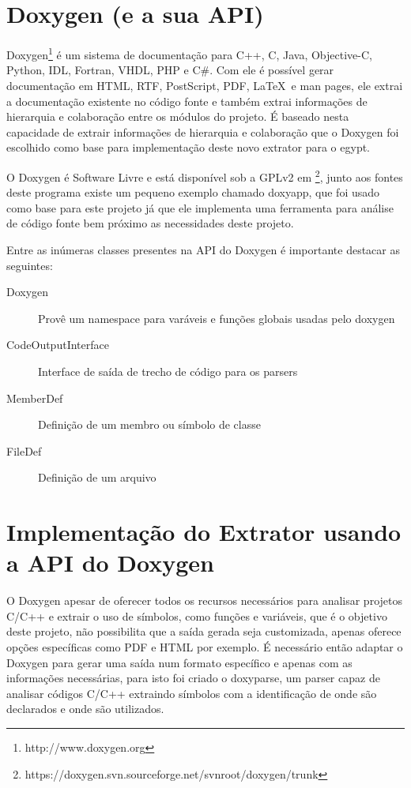 \section{Doxygen (e a sua API)}

Doxygen\footnote{http://www.doxygen.org} é um sistema de documentação para C++,
C, Java, Objective-C, Python, IDL, Fortran, VHDL, PHP e C\#. Com ele é possível
gerar documentação em HTML, RTF, PostScript, PDF, \LaTeX\ e man pages, ele
extrai a documentação existente no código fonte e também extrai informações de
hierarquia e colaboração entre os módulos do projeto. É baseado nesta
capacidade de extrair informações de hierarquia e colaboração que o Doxygen foi
escolhido como base para implementação deste novo extrator para o egypt.

O Doxygen é Software Livre e está disponível sob a GPLv2 em
\footnote{https://doxygen.svn.sourceforge.net/svnroot/doxygen/trunk}, junto aos
fontes deste programa existe um pequeno exemplo chamado doxyapp, que foi usado
como base para este projeto já que ele implementa uma ferramenta para análise
de código fonte bem próximo as necessidades deste projeto.

Entre as inúmeras classes presentes na API do Doxygen é importante
destacar as seguintes:

\begin{description}
\item[Doxygen] Provê um namespace para varáveis e funções globais usadas pelo doxygen
\item[CodeOutputInterface] Interface de saída de trecho de código para os parsers
\item[MemberDef] Definição de um membro ou símbolo de classe
\item[FileDef] Definição de um arquivo
\end{description}

\section{Implementação do Extrator usando a API do Doxygen}

O Doxygen apesar de oferecer todos os recursos necessários para
analisar projetos C/C++ e extrair o uso de símbolos, como funções e variáveis,
que é o objetivo deste projeto, não possibilita que a saída gerada seja
customizada, apenas oferece opções específicas como PDF e HTML por exemplo. É
necessário então adaptar o Doxygen para gerar uma saída num formato
específico e apenas com as informações necessárias, para isto foi criado o
doxyparse, um parser capaz de analisar códigos C/C++ extraindo símbolos
com a identificação de onde são declarados e onde são utilizados.

